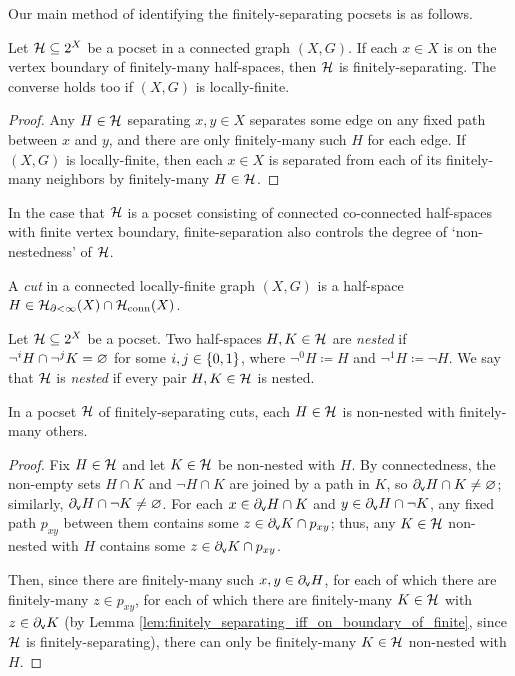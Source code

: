 \documentclass[reqno]{amsart}
\begin{document}
    Our main method of identifying the finitely-separating pocsets is as follows.

    \begin{lemma}\label{lem:finitely_separating_iff_on_boundary_of_finite}
        Let $\mc{H}\subseteq2^X$ be a pocset in a connected graph $(X,G)$. If each $x\in X$ is on the vertex boundary of finitely-many half-spaces, then $\mc{H}$ is finitely-separating. The converse holds too if $(X,G)$ is locally-finite.
    \end{lemma}
    \begin{proof}
        Any $H\in\mc{H}$ separating $x,y\in X$ separates some edge on any fixed path between $x$ and $y$, and there are only finitely-many such $H$ for each edge. If $(X,G)$ is locally-finite, then each $x\in X$ is separated from each of its finitely-many neighbors by finitely-many $H\in\mc{H}$.
    \end{proof}

    In the case that $\mc{H}$ is a pocset consisting of connected co-connected half-spaces with finite vertex boundary, finite-separation also controls the degree of `non-nestedness' of $\mc{H}$.

    \begin{definition}
        A \textit{cut} in a connected locally-finite graph $(X,G)$ is a half-space $H\in\mc{H}_{\del<\infty}(X)\cap\mc{H}_\mathrm{conn}(X)$.
    \end{definition}

    \begin{definition}\label{def:nested}
        Let $\mc{H}\subseteq2^X$ be a pocset. Two half-spaces $H,K\in\mc{H}$ are \textit{nested} if $\lnot^iH\cap\lnot^jK=\em$ for some $i,j\in\l\{0,1\r\}$, where $\lnot^0H\coloneqq H$ and $\lnot^1H\coloneqq\lnot H$. We say that $\mc{H}$ is \textit{nested} if every pair $H,K\in\mc{H}$ is nested.
    \end{definition}

    \begin{lemma}\label{lem:connected_cuts_non_nested_finitely_others}
        In a pocset $\mc{H}$ of finitely-separating cuts, each $H\in\mc{H}$ is non-nested with finitely-many others.
    \end{lemma}
    \begin{proof}
        Fix $H\in\mc{H}$ and let $K\in\mc{H}$ be non-nested with $H$. By connectedness, the non-empty sets $H\cap K$ and $\lnot H\cap K$ are joined by a path in $K$, so $\del_\mathsf{v}H\cap K\neq\em$; similarly, $\del_\mathsf{v}H\cap\lnot K\neq\em$. For each $x\in\del_\mathsf{v}H\cap K$ and $y\in\del_\mathsf{v}H\cap\lnot K$, any fixed path $p_{xy}$ between them contains some $z\in\del_\mathsf{v}K\cap p_{xy}$; thus, any $K\in\mc{H}$ non-nested with $H$ contains some $z\in\del_\mathsf{v}K\cap p_{xy}$.

        Then, since there are finitely-many such $x,y\in\del_\mathsf{v}H$, for each of which there are finitely-many $z\in p_{xy}$, for each of which there are finitely-many $K\in\mc{H}$ with $z\in\del_\mathsf{v}K$ (by Lemma \ref{lem:finitely_separating_iff_on_boundary_of_finite}, since $\mc{H}$ is finitely-separating), there can only be finitely-many $K\in\mc{H}$ non-nested with $H$.
    \end{proof}
\end{document}
